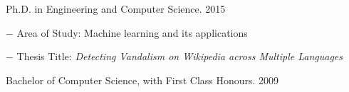 \documentclass[10pt]{article}
\newcommand{\halfblankline}{\quad\vspace{-0.5\baselineskip}\pagebreak[3]}
\begin{document}
\begin{outerlist}
\item Ph.D. in Engineering and Computer Science. \hfill 2015
	\begin{innerlist}
		\item[$-$] Area of Study: Machine learning and its applications
		\item[$-$] Thesis Title: \emph{Detecting Vandalism on Wikipedia across Multiple Languages}
		
		
	\end{innerlist}

\item Bachelor of Computer Science, with First Class Honours. \hfill 2009
\end{outerlist}
\end{document}
